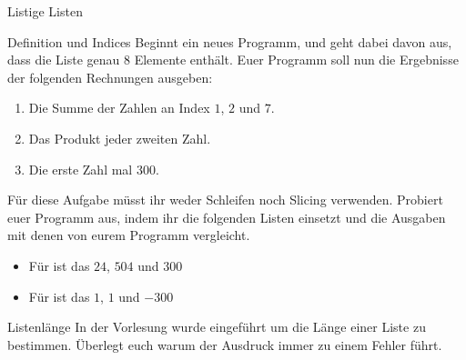 \begin{task}[points=auto]{Listige Listen}
    \begin{subtask*}[points=0]{Definition und Indices }
        Beginnt ein neues Programm, und geht dabei davon aus, dass die Liste
         genau $8$ Elemente enthält. Euer Programm soll
        nun die Ergebnisse der folgenden Rechnungen ausgeben:

        \begin{enumerate}
            \item Die Summe der Zahlen an Index $1$, $2$ und $7$.
            \item Das Produkt jeder zweiten Zahl.
            \item Die erste Zahl mal 300.
        \end{enumerate}

        Für diese Aufgabe müsst ihr weder Schleifen noch Slicing verwenden. Probiert
        euer Programm aus, indem ihr die folgenden Listen einsetzt und die Ausgaben
        mit denen von eurem Programm vergleicht.

        \begin{itemize}
            \item Für  ist das $24$, $504$ und $300$
            \item Für  ist das $1$, $1$ und $-300$
        \end{itemize}

        \begin{solution}
        \end{solution}
    \end{subtask*}
    \begin{subtask*}[points=0]{Listenlänge }
        In der Vorlesung wurde  eingeführt um die Länge einer
        Liste zu bestimmen. Überlegt euch warum der Ausdruck 
        immer zu einem Fehler führt.


\end{subtask*}
\end{task}
